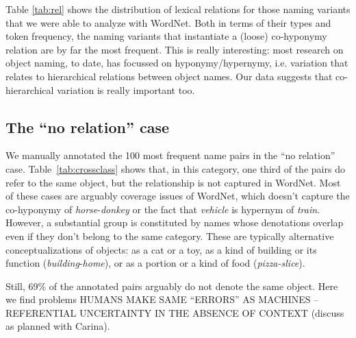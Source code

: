  

Table \ref{tab:rel} shows the distribution of lexical relations for those naming variants that we were able to analyze with WordNet.
Both in terms of their types and token frequency, the naming variants that instantiate a (loose) co-hyponymy relation are by far the most frequent.
This is really interesting: most research on object naming, to date, has focussed on hyponymy/hypernymy, i.e. variation that relates to hierarchical relations between object names.
Our data suggests that co-hierarchical variation is really important too.

\subsection{The ``no relation'' case}

We manually annotated the 100 most frequent name pairs in the ``no relation'' case. Table~\ref{tab:crossclass} shows that, in this category, one third of the pairs do refer to the same object, but the relationship is not captured in WordNet. 
Most of these cases are arguably coverage issues of WordNet, which doesn't capture the co-hyponymy of \textit{horse}-\textit{donkey} or the fact that \textit{vehicle} is hypernym of \textit{train}.
However, a substantial group is constituted by names whose denotations overlap even if they don't belong to the same category. These are typically alternative conceptualizations of objects: as a cat or a toy, as a kind of building or its function (\textit{building}-\textit{home}), or as a portion or a kind of food (\textit{pizza-slice}).

Still, 69\% of the annotated pairs arguably do not denote the same object. Here we find problems HUMANS MAKE SAME ``ERRORS'' AS MACHINES -- REFERENTIAL UNCERTAINTY IN THE ABSENCE OF CONTEXT (discuss as planned with Carina).


